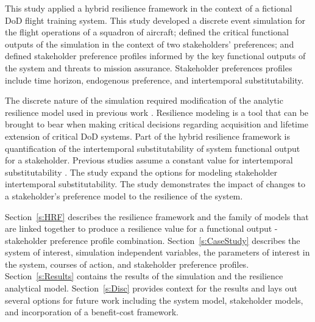 \documentclass[preprint,12pt]{elsarticle}
\begin{document}
This study applied a hybrid resilience framework
\cite{Ayyub2014,Ayyub2015,Emanuel2017,Emanuel2018} in the context of
a fictional DoD flight training system. This study developed a
discrete event simulation for the flight operations of a squadron of
aircraft; defined the critical functional outputs of the simulation
in the context of two stakeholders' preferences; and defined
stakeholder preference profiles informed by the key functional outputs
of the system and threats to mission assurance. Stakeholder
preferences profiles include
time horizon, endogenous preference, and intertemporal
substitutability.

The discrete nature of the simulation required
modification of the analytic resilience model used in previous work
\cite{Ayyub2014,Ayyub2015,Emanuel2017,Emanuel2018}.  
Resilience modeling is a tool that can be brought to bear when making 
critical decisions regarding acquisition and lifetime extension of
critical DoD systems. Part of the
hybrid resilience framework is quantification of 
the intertemporal substitutability of system functional output for a
stakeholder. Previous studies  assume a
constant value for intertemporal substitutability
\cite{Emanuel2017,Emanuel2018}. The study  expand the options for
modeling stakeholder intertemporal substitutability. The study
demonstrates the impact of changes to a stakeholder's preference model
to the resilience of the system. 


Section~\ref{s:HRF} describes the
resilience framework and the family of models that are linked
together to produce a resilience value for a functional output -
stakeholder preference profile combination. Section~\ref{s:CaseStudy}
describes the system of interest, simulation independent variables, the parameters of
interest in the system, courses of action, and stakeholder preference
profiles. Section~\ref{s:Results} contains the results of the 
simulation and the resilience analytical model. Section~\ref{s:Disc}
provides context for the results and lays out several options for
future work including the system model, stakeholder
models, and incorporation of a benefit-cost framework. 
\end{document}
